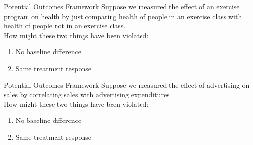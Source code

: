\documentclass[11pt]{beamer}
\begin{document}
\begin{frame}[c]{Potential Outcomes Framework}
Suppose we measured the effect of an exercise program on health by just comparing health of people in an exercise class with health of people not in an exercise class. \\
How might these two things have been violated:
\begin{enumerate}
  \item No baseline difference
  \item Same treatment response
\end{enumerate}
\end{frame}


\begin{frame}[c]{Potential Outcomes Framework}
Suppose we measured the effect of advertising on sales by correlating sales with advertising expenditures. \\

How might these two things have been violated:
  \begin{enumerate}
    \item No baseline difference
    \item Same treatment response
  \end{enumerate}
\end{frame}
\end{document}
